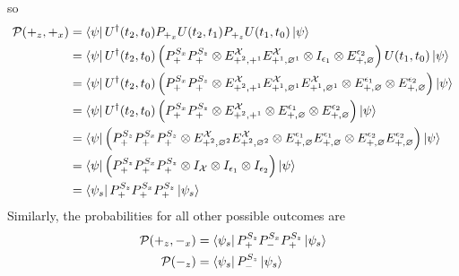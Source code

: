 so
\begin{align}
  \mathcal{P}(+_z, +_x) &= \bra{\psi} U^\dagger(t_2, t_0) P_{+_x} U(t_2, t_1) P_{+_z} U(t_1, t_0) \ket{\psi} \\ \nonumber
  &= \bra{\psi} U^\dagger(t_2, t_0) \left(P^{S_x}_+ P^{S_z}_+ \otimes E^\mathcal{X}_{+^2, +^1} E^\mathcal{X}_{+^1, \varnothing^1} \otimes I_{\epsilon_1} \otimes E^{\epsilon_2}_{+, \varnothing} \right) U(t_1, t_0) \ket{\psi} \\ \nonumber
  &= \bra{\psi}  U^\dagger(t_2, t_0) \left(P^{S_x}_+ P^{S_z}_+ \otimes E^\mathcal{X}_{+^2, +^1} E^\mathcal{X}_{+^1, \varnothing^1}  E^{\mathcal{X}}_{+^1, \varnothing^1} \otimes E^{\epsilon_1}_{+, \varnothing} \otimes E^{\epsilon_2}_{+, \varnothing} \right) \ket{\psi} \\ \nonumber
  &= \bra{\psi}  U^\dagger(t_2, t_0) \left(P^{S_x}_+ P^{S_z}_+ \otimes E^\mathcal{X}_{+^2, +^1} \otimes E^{\epsilon_1}_{+, \varnothing} \otimes E^{\epsilon_2}_{+, \varnothing} \right) \ket{\psi}  \\ \nonumber
  &= \bra{\psi} \left(P^{S_z}_+ P^{S_x}_+ P^{S_z}_+ \otimes E^\mathcal{X}_{+^2, \varnothing^2}E^\mathcal{X}_{+^2, \varnothing^2} \otimes E^{\epsilon_1}_{+, \varnothing} E^{\epsilon_1}_{+, \varnothing} \otimes E^{\epsilon_2}_{+, \varnothing} E^{\epsilon_2}_{+, \varnothing} \right) \ket{\psi} \\ \nonumber
  &= \bra{\psi} \left(P^{S_z}_+ P^{S_x}_+ P^{S_z}_+ \otimes I_\mathcal{X}  \otimes I_{\epsilon_1} \otimes I_{\epsilon_2} \right) \ket{\psi} \\ \nonumber
  &= \bra{\psi_s} P^{S_z}_+ P^{S_x}_+ P^{S_z}_+ \ket{\psi_s}
\end{align}
Similarly, the probabilities for all other possible outcomes are
\begin{align}
  \mathcal{P}(+_z, -_x) &= \bra{\psi_s} P^{S_z}_+ P^{S_x}_- P^{S_z}_+ \ket{\psi_s} \\ \nonumber
  \mathcal{P}(-_z) &= \bra{\psi_s} P^{S_z}_- \ket{\psi_s}
\end{align}
